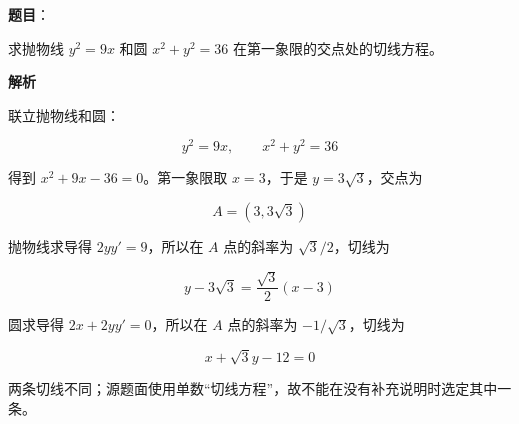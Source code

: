 \begin{answer}

\textbf{题目}：

求抛物线 $y^2=9x$ 和圆 $x^2+y^2=36$ 在第一象限的交点处的切线方程。

\textbf{解析}

联立抛物线和圆：

\nopagebreak[4]
\[
y^2=9x,\qquad x^2+y^2=36
\]

得到 $x^2+9x-36=0$。第一象限取 $x=3$，于是 $y=3\sqrt3$，交点为

\nopagebreak[4]
\[
A=(3,3\sqrt3)
\]

抛物线求导得 $2yy'=9$，所以在 $A$ 点的斜率为 $\sqrt3/2$，切线为

\nopagebreak[4]
\[
y-3\sqrt3=\frac{\sqrt3}{2}(x-3)
\]

圆求导得 $2x+2yy'=0$，所以在 $A$ 点的斜率为 $-1/\sqrt3$，切线为

\nopagebreak[4]
\[
x+\sqrt3y-12=0
\]

两条切线不同；源题面使用单数“切线方程”，故不能在没有补充说明时选定其中一条。


\end{answer}
